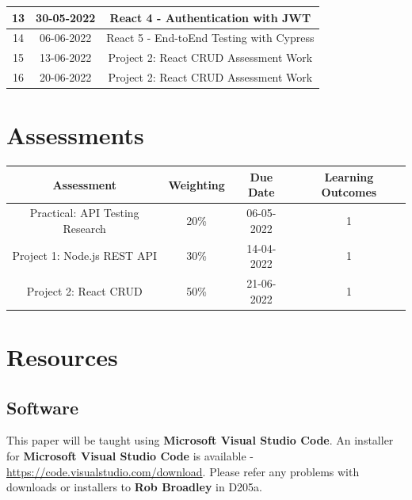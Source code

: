 \documentclass{article}
\begin{document}
\begin{tabular}{|c|c|c|c|}
	\footnotesize 13     & \footnotesize 30-05-2022 & \multicolumn{2}{c|}{\footnotesize React 4 - Authentication with JWT}    \\ \hline
	\footnotesize 14     & \footnotesize 06-06-2022 & \multicolumn{2}{c|}{\footnotesize React 5 - End-toEnd Testing with Cypress}     \\ \hline
	\footnotesize 15     & \footnotesize 13-06-2022 & \multicolumn{2}{c|}{\footnotesize Project 2: React CRUD Assessment Work}     \\ \hline
	\footnotesize 16     & \footnotesize 20-06-2022 & \multicolumn{2}{c|}{\footnotesize Project 2: React CRUD Assessment Work}     \\ \hline
\end{tabular}

\section*{Assessments}
\renewcommand{\arraystretch}{1.5}
\begin{tabular}{|c|c|c|c|}
	\hline
	\textbf{Assessment}                                & \textbf{Weighting} & \textbf{Due Date} & \textbf{Learning Outcomes} \\ \hline 
	\small Practical: API Testing Research             & \small 20\%        & \small 06-05-2022 & \small 1                   \\ \hline
	\small Project 1: Node.js REST API                 & \small 30\%        & \small 14-04-2022 & \small 1                   \\ \hline
	\small Project 2: React CRUD                       & \small 50\%        & \small 21-06-2022 & \small 1                   \\ \hline 
\end{tabular} 

\section*{Resources}

\subsection*{Software}
This paper will be taught using \textbf{Microsoft Visual Studio Code}. An installer for \textbf{Microsoft Visual Studio Code} is available - \href{https://code.visualstudio.com/download}{https://code.visualstudio.com/download}. Please refer any problems with downloads or installers to \textbf{Rob Broadley} in D205a.
\end{document}
